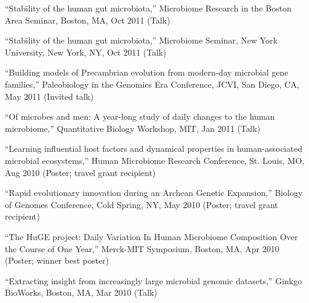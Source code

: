 \documentclass[overlapped,line,11pt]{res}
\newenvironment{list2}{
  \begin{list}{$\bullet$}{%
      \setlength{\itemsep}{0in}
      \setlength{\parsep}{0in} \setlength{\parskip}{0in}
      \setlength{\topsep}{0in} \setlength{\partopsep}{0in} 
      \setlength{\leftmargin}{0.2in}}}{\end{list}}
\begin{document}
\begin{resume}
\begin{revnumerate}[26]
\item {``Stability of the human gut microbiota,'' Microbiome Research
  in the Boston Area Seminar, Boston, MA, Oct 2011 (Talk)}
\vspace*{0mm}

\item {``Stability of the human gut microbiota,'' Microbiome Seminar,
  New York University, New York, NY, Oct 2011 (Talk)}
\vspace*{0mm}

\item {``Building models of Precambrian evolution from modern-day
  microbial gene families,'' Paleobiology in the Genomics Era
  Conference, JCVI, San Diego, CA, May 2011 (Invited talk)}
\vspace*{0mm}

\item {``Of microbes and men:
A year-long study of daily changes to the human microbiome,''
Quantitative Biology Workshop, MIT, Jan 2011 (Talk)}
\vspace*{0mm}

\item {``Learning influential host factors and dynamical properties in
human-associated microbial ecosystems,'' Human Microbiome Research
Conference, St. Louis, MO, Aug 2010 (Poster; travel grant recipient)}
\vspace*{0mm}

\item {``Rapid evolutionary innovation during an Archean Genetic
  Expansion,'' Biology of Genomes Conference, Cold Spring, NY,
  May 2010 (Poster; travel grant recipient)}
\vspace*{0mm}


\item {``The HuGE project: Daily Variation In Human Microbiome
Composition Over the Course of One Year,'' Merck-MIT Symposium,
Boston, MA, Apr 2010 (Poster; winner best poster)}
\vspace*{0mm}


\item {``Extracting insight from increasingly large microbial genomic
  datasets,'' Ginkgo BioWorks, Boston, MA, Mar 2010 (Talk)}
\vspace*{0mm}

\end{revnumerate}




\end{resume}
\end{document}
